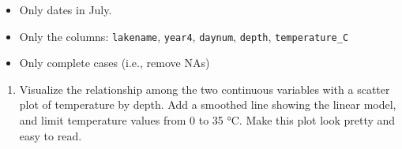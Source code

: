 \documentclass[
]{article}
\providecommand{\tightlist}{%
  \setlength{\itemsep}{0pt}\setlength{\parskip}{0pt}}
\begin{document}
\begin{itemize}
\tightlist
\item
  Only dates in July.
\item
  Only the columns: \texttt{lakename}, \texttt{year4}, \texttt{daynum},
  \texttt{depth}, \texttt{temperature\_C}
\item
  Only complete cases (i.e., remove NAs)
\end{itemize}

\begin{enumerate}
\def\labelenumi{\arabic{enumi}.}
\setcounter{enumi}{4}
\tightlist
\item
  Visualize the relationship among the two continuous variables with a
  scatter plot of temperature by depth. Add a smoothed line showing the
  linear model, and limit temperature values from 0 to 35 °C. Make this
  plot look pretty and easy to read.
\end{enumerate}
\end{document}
